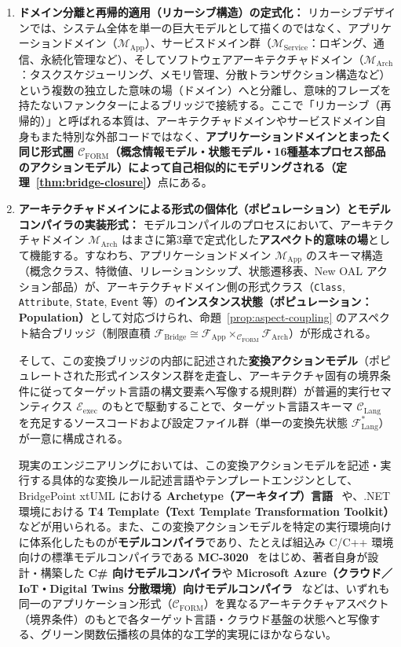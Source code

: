\documentclass[11pt,a4paper]{ltjsarticle}
\theoremstyle{definition}
\theoremstyle{plain}
\theoremstyle{remark}
\newcommand{\CFORM}{\mathcal{C}_{\mathrm{FORM}}}
\newcommand{\Eexec}{\mathcal{E}_{\mathrm{exec}}}
\begin{document}
\begin{enumerate}
    \item \textbf{ドメイン分離と再帰的適用（リカーシブ構造）の定式化：}
    リカーシブデザインでは、システム全体を単一の巨大モデルとして描くのではなく、アプリケーションドメイン（$\mathcal{M}_{\mathrm{App}}$）、サービスドメイン群（$\mathcal{M}_{\mathrm{Service}}$：ロギング、通信、永続化管理など）、そしてソフトウェアアーキテクチャドメイン（$\mathcal{M}_{\mathrm{Arch}}$：タスクスケジューリング、メモリ管理、分散トランザクション構造など）という複数の独立した意味の場（ドメイン）へと分離し、意味的フレーズを持たないファンクターによるブリッジで接続する。ここで「リカーシブ（再帰的）」と呼ばれる本質は、アーキテクチャドメインやサービスドメイン自身もまた特別な外部コードではなく、\textbf{アプリケーションドメインとまったく同じ形式圏 $\CFORM$（概念情報モデル・状態モデル・16種基本プロセス部品のアクションモデル）によって自己相似的にモデリングされる（定理~\ref{thm:bridge-closure}）}点にある。

    \item \textbf{アーキテクチャドメインによる形式の個体化（ポピュレーション）とモデルコンパイラの実装形式：}
    モデルコンパイルのプロセスにおいて、アーキテクチャドメイン $\mathcal{M}_{\mathrm{Arch}}$ はまさに第3章で定式化した\textbf{アスペクト的意味の場}として機能する。すなわち、アプリケーションドメイン $\mathcal{M}_{\mathrm{App}}$ のスキーマ構造（概念クラス、特徴値、リレーションシップ、状態遷移表、New OAL アクション部品）が、アーキテクチャドメイン側の形式クラス（\texttt{Class}, \texttt{Attribute}, \texttt{State}, \texttt{Event} 等）の\textbf{インスタンス状態（ポピュレーション：Population）}として対応づけられ、命題~\ref{prop:aspect-coupling} のアスペクト結合ブリッジ（制限直積 $\mathcal{F}_{\mathrm{Bridge}} \cong \mathcal{F}_{\mathrm{App}} \times_{\CFORM} \mathcal{F}_{\mathrm{Arch}}$）が形成される。

    そして、この変換ブリッジの内部に記述された\textbf{変換アクションモデル}（ポピュレートされた形式インスタンス群を走査し、アーキテクチャ固有の境界条件に従ってターゲット言語の構文要素へ写像する規則群）が普遍的実行セマンティクス $\Eexec$ のもとで駆動することで、ターゲット言語スキーマ $\mathcal{C}_{\mathrm{Lang}}$ を充足するソースコードおよび設定ファイル群（単一の変換先状態 $\mathcal{F}_{\mathrm{Lang}}^*$）が一意に構成される。

    現実のエンジニアリングにおいては、この変換アクションモデルを記述・実行する具体的な変換ルール記述言語やテンプレートエンジンとして、BridgePoint xtUML における \textbf{Archetype（アーキタイプ）言語}~\cite{xtumlorg} や、.NET 環境における \textbf{T4 Template（Text Template Transformation Toolkit）} などが用いられる。また、この変換アクションモデルを特定の実行環境向けに体系化したものが\textbf{モデルコンパイラ}であり、たとえば組込み C/C++ 環境向けの標準モデルコンパイラである \textbf{MC-3020}~\cite{mellor2002,xtumlorg} をはじめ、著者自身が設計・構築した \textbf{C\# 向けモデルコンパイラ}や \textbf{Microsoft Azure（クラウド／IoT・Digital Twins 分散環境）向けモデルコンパイラ}~\cite{ota2023azure} などは、いずれも同一のアプリケーション形式（$\CFORM$）を異なるアーキテクチャアスペクト（境界条件）のもとで各ターゲット言語・クラウド基盤の状態へと写像する、グリーン関数伝播核の具体的な工学的実現にほかならない。


\end{enumerate}
\end{document}
